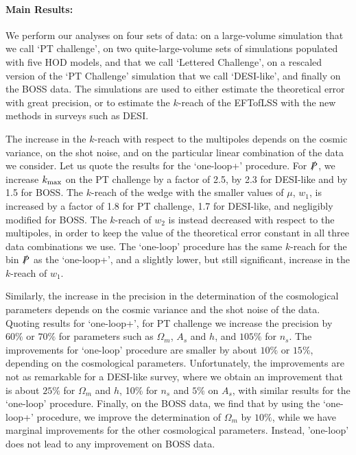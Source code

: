 \documentclass[12pt,a4paper]{article}
\def\PA{\slashed{P}}
\renewcommand{\(}{\left(}
\renewcommand{\)}{\right)}
\begin{document}
{\paragraph{Main Results:} 

We perform our analyses on four sets of data: on a large-volume simulation that we call `PT challenge', on two quite-large-volume sets of simulations populated with five HOD models, and that we call `Lettered Challenge', on a rescaled version of the `PT Challenge' simulation that we call `DESI-like', and finally on the BOSS data. The simulations are used to either estimate the theoretical error with great precision, or to estimate the $k$-reach of the EFTofLSS with the new methods in surveys such as DESI.  

The increase in the $k$-reach with respect to the multipoles depends on the cosmic variance, on the shot noise, and on the particular linear combination of the data we consider. Let us quote the results for the `one-loop+' procedure. For $\PA$, {we increase $k_{\rm max}$ on the PT challenge by a factor of 2.5, by 2.3 for DESI-like and by 1.5 for BOSS}. The $k$-reach of the wedge with the smaller values of $\mu$, $w_1$, is increased by a factor of 1.8 for PT challenge, 1.7 for DESI-like, and {negligibly modified} for BOSS. The $k$-reach of $w_2$ is instead decreased with respect to the multipoles, in order to keep the value of the theoretical error constant in all {three data combinations we use}. The `one-loop' procedure has the same $k$-reach for the bin $\PA$ as the `one-loop+',  and a slightly lower, but still significant, {increase} in the $k$-reach of $w_1$.

Similarly, the increase in the precision in the determination of the cosmological parameters depends on the cosmic variance and the shot noise of the data. Quoting results for `one-loop+', for PT challenge we increase the precision by $60\%$ or $70\%$ for parameters such as $\Omega_m$, $A_s$ and $h$, and $105\%$ for $n_s$. The improvements for `one-loop' procedure are smaller by about $10\%$ or $15\%$, depending on the cosmological parameters. Unfortunately, the improvements are not as remarkable for a DESI-like survey, where we obtain an improvement that is about $25\%$ for $\Omega_m$ and $h$, 10\% for $n_s$ and $5\%$ on $A_s$, with similar results for the `one-loop' procedure. Finally, on the BOSS data, we find that by using the `one-loop+' procedure, we improve the determination of $\Omega_m$ by $10\%$, while we have marginal improvements for the other cosmological parameters. Instead, 'one-loop' does not lead to any improvement on BOSS data.

}
\end{document}
